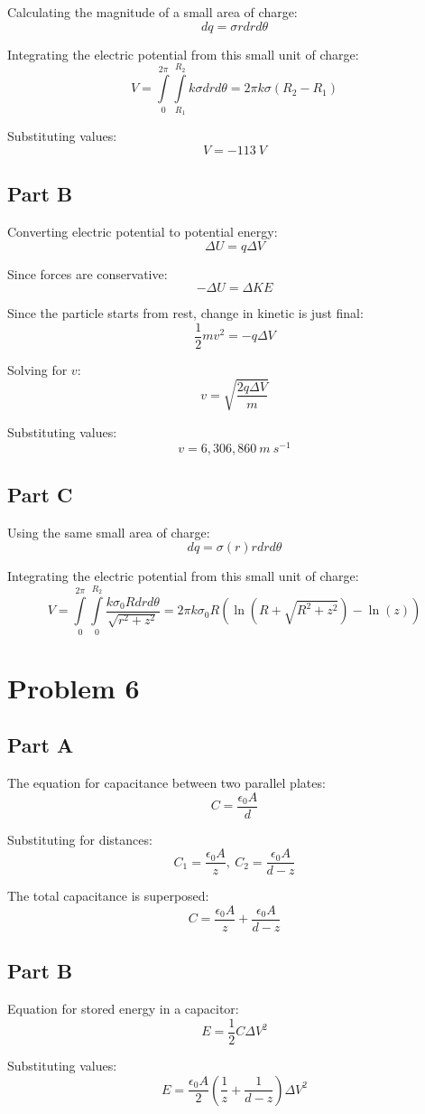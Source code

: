 \documentclass{article}
\begin{document}
Calculating the magnitude of a small area of charge:
$$ dq = \sigma r dr d\theta $$

Integrating the electric potential from this small unit of charge:
$$ V = \int\limits_{0}^{2 \pi}\int\limits_{R_{1}}^{R_{2}} k \sigma dr
d\theta = 2 \pi k \sigma (R_{2} - R_{1})$$

Substituting values:
$$ V = -113\ \si{V} $$

\subsection*{Part B}

Converting electric potential to potential energy:
$$ \Delta U = q\Delta V  $$

Since forces are conservative:
$$ -\Delta U = \Delta KE $$

Since the particle starts from rest, change in kinetic is just final:
$$ \frac{ 1 }{ 2 } m v^{2} = -q \Delta V $$

Solving for $v$:
$$ v = \sqrt{\frac{ 2 q \Delta V }{ m }} $$

Substituting values:
$$ v = 6,306,860 \ \si{m\ s^{-1}} $$

\subsection*{Part C}

Using the same small area of charge:
$$ dq = \sigma(r) r dr d\theta $$

Integrating the electric potential from this small unit of charge:
$$ V = \int\limits_{0}^{2 \pi}\int\limits_{0}^{R_{2}} \frac{ k \sigma_{0} R dr
  d\theta}{\sqrt{r^{2} + z^{2}}} = 2 \pi k \sigma_{0} R \left(\ln(R + \sqrt{R^{2} +
z^{2}}) - \ln(z)\right)$$

\section*{Problem 6}

\subsection*{Part A}

The equation for capacitance between two parallel plates:
$$ C = \frac{ \epsilon_{0} A }{ d } $$

Substituting for distances:
$$ C_{1} = \frac{ \epsilon_{0} A }{ z },\ C_{2} = \frac{ \epsilon_{0} A }{ d - z } $$

The total capacitance is superposed:
$$ C =  \frac{ \epsilon_{0} A }{ z } + \frac{ \epsilon_{0} A }{ d - z }$$

\subsection*{Part B}

Equation for stored energy in a capacitor:
$$ E = \frac{ 1 }{ 2 } C \Delta V^{2} $$

Substituting values:
$$ E = \frac{ \epsilon_{0} A }{ 2 } \left( \frac{ 1 }{ z } + \frac{ 1 }{ d - z }
\right) \Delta V^{2} $$
\end{document}
